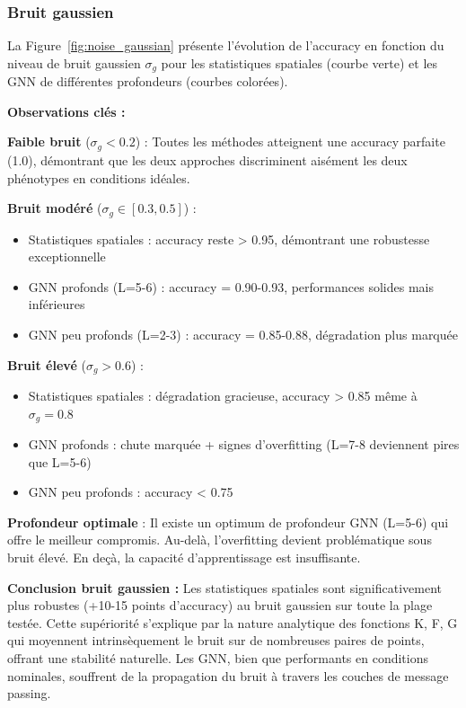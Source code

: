 \subsubsection{Bruit gaussien}

La Figure~\ref{fig:noise_gaussian} présente l'évolution de l'accuracy en fonction du niveau de bruit gaussien $\sigma_g$ pour les statistiques spatiales (courbe verte) et les GNN de différentes profondeurs (courbes colorées).

\textbf{Observations clés :}

\textbf{Faible bruit} ($\sigma_g < 0.2$) : Toutes les méthodes atteignent une accuracy parfaite (1.0), démontrant que les deux approches discriminent aisément les deux phénotypes en conditions idéales.

\textbf{Bruit modéré} ($\sigma_g \in [0.3, 0.5]$) :
\begin{itemize}
    \item Statistiques spatiales : accuracy reste > 0.95, démontrant une robustesse exceptionnelle
    \item GNN profonds (L=5-6) : accuracy = 0.90-0.93, performances solides mais inférieures
    \item GNN peu profonds (L=2-3) : accuracy = 0.85-0.88, dégradation plus marquée
\end{itemize}

\textbf{Bruit élevé} ($\sigma_g > 0.6$) :
\begin{itemize}
    \item Statistiques spatiales : dégradation gracieuse, accuracy > 0.85 même à $\sigma_g = 0.8$
    \item GNN profonds : chute marquée + signes d'overfitting (L=7-8 deviennent pires que L=5-6)
    \item GNN peu profonds : accuracy < 0.75
\end{itemize}

\textbf{Profondeur optimale} : Il existe un optimum de profondeur GNN (L=5-6) qui offre le meilleur compromis. Au-delà, l'overfitting devient problématique sous bruit élevé. En deçà, la capacité d'apprentissage est insuffisante.

\textbf{Conclusion bruit gaussien :} Les statistiques spatiales sont significativement plus robustes (+10-15 points d'accuracy) au bruit gaussien sur toute la plage testée. Cette supériorité s'explique par la nature analytique des fonctions K, F, G qui moyennent intrinsèquement le bruit sur de nombreuses paires de points, offrant une stabilité naturelle. Les GNN, bien que performants en conditions nominales, souffrent de la propagation du bruit à travers les couches de message passing.

